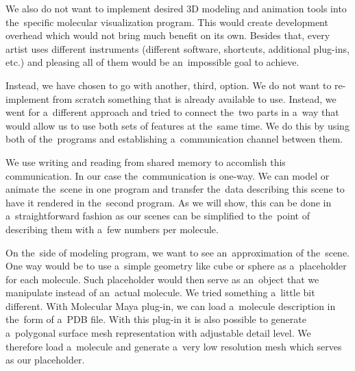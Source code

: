 \documentclass[
  digital, %
  table,   %
  nolof,     %
  nolot,     %
  oneside,
]{fithesis3}
\begin{document}
We also do not want to implement desired 3D modeling and animation tools into the specific molecular visualization program. This would create development overhead which would not bring much benefit on its own. Besides that, every artist uses different instruments (different software, shortcuts, additional plug-ins, etc.) and pleasing all of them would be an impossible goal to achieve.

Instead, we have chosen to go with another, third, option. We do not want to re-implement from scratch something that is already available to use. Instead, we went for a different approach and tried to connect the two parts in a way that would allow us to use both sets of features at the same time. We do this by using both of the programs and establishing a communication channel between them.

We use writing and reading from shared memory to accomlish this communication. In our case the communication is one-way. We can model or animate the scene in one program and transfer the data describing this scene to have it rendered in the second program. As we will show, this can be done in a straightforward fashion as our scenes can be simplified to the point of describing them with a few numbers per molecule.

On the side of modeling program, we want to see an approximation of the scene. One way would be to use a simple geometry like cube or sphere as a placeholder for each molecule. Such placeholder would then serve as an object that we manipulate instead of an actual molecule. We tried something a little bit different. With Molecular Maya plug-in, we can load a molecule description in the form of a PDB file. With this plug-in it is also possible to generate a polygonal surface mesh representation with adjustable detail level. We therefore load a molecule and generate a very low resolution mesh which serves as our placeholder.
\end{document}
